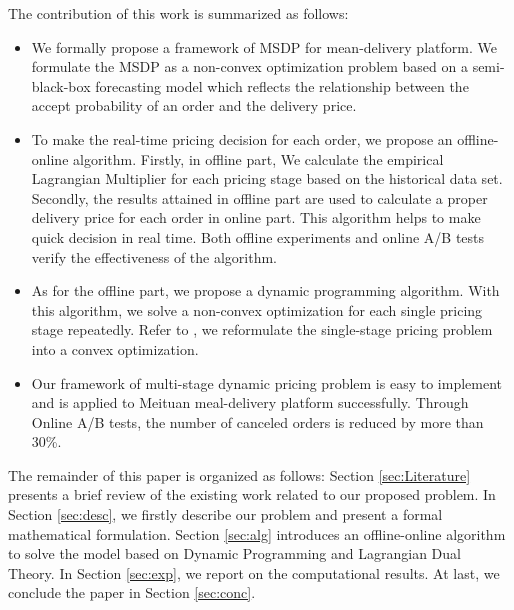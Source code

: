 \documentclass[sigconf,authordraft]{acmart}
\begin{document}
The contribution of this work is summarized as follows:
\begin{itemize}
\item We formally propose a framework of MSDP for mean-delivery platform. We formulate the MSDP as a non-convex optimization problem based on a semi-black-box forecasting model which reflects the relationship between the accept probability of an order and the delivery price.
\item To make the real-time pricing decision for each order, we propose an offline-online algorithm. Firstly, in offline part, We calculate the empirical Lagrangian Multiplier for each pricing stage based on the historical data set. Secondly, the results attained in offline part are used to calculate a proper delivery price for each order in online part. This algorithm helps to make quick decision in real time. Both offline experiments and online A/B tests verify the effectiveness of the algorithm.
\item As for the offline part, we propose a dynamic programming algorithm. With this algorithm, we solve a non-convex optimization for each single pricing stage repeatedly. Refer to \cite{zhao2019unified}, we reformulate the single-stage pricing problem into a convex optimization.
\item Our framework of multi-stage dynamic pricing problem is easy to implement and is applied to Meituan meal-delivery platform successfully. Through Online A/B tests, the number of canceled orders is reduced by more than 30\%.
\end{itemize}
The remainder of this paper is organized as follows: Section \ref{sec:Literature} presents a brief review of the existing work related to our proposed problem. In Section \ref{sec:desc}, we firstly describe our problem and present a formal mathematical formulation. Section \ref{sec:alg} introduces an offline-online algorithm to solve the model based on Dynamic Programming and Lagrangian Dual Theory. In Section \ref{sec:exp}, we report on the computational results. At last, we conclude the paper in Section \ref{sec:conc}.
\end{document}
